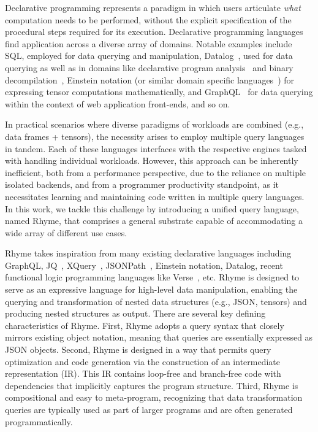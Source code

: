 \documentclass[runningheads]{llncs}
\newcommand{\lang}{Rhyme}
\begin{document}
Declarative programming represents a paradigm in which users articulate \emph{what}
computation needs to be performed, without the explicit specification of the
procedural steps required for its execution.
Declarative programming languages find application across a diverse array of
domains.
Notable examples include SQL, employed for data querying and manipulation,
Datalog~\cite{datalog}, used for data querying as well as in domains like
declarative program analysis~\cite{proganalysis_first, logic_proganalysis, souffle_cav}
and binary decompilation~\cite{ddissam}, Einstein notation (or similar domain
specific languages~\cite{tensor_comprehensions}) for expressing tensor computations
mathematically, and GraphQL~\cite{graphql} for data querying within the context of web application
front-ends, and so on.

In practical scenarios where diverse paradigms of workloads are combined
(e.g., data frames + tensors), the necessity arises to employ multiple
query languages in tandem.
Each of these languages interfaces with the respective engines tasked
with handling individual workloads.
However, this approach can be inherently inefficient, both from a performance
perspective, due to the reliance on multiple isolated backends, and from
a programmer productivity standpoint, as it necessitates learning and
maintaining code written in multiple query languages.
In this work, we tackle this challenge by introducing a unified query language, 
named \lang{},
that comprises a general substrate capable of accommodating a wide array of
different use cases.

\lang{} takes inspiration from many existing declarative languages
including GraphQL, JQ~\cite{jq}, XQuery~\cite{xquery}, JSONPath~\cite{jsonpath}, Einstein notation,
Datalog, recent functional logic programming languages like Verse~\cite{verse}, etc.
\lang{} is designed to serve as an expressive language for high-level data
manipulation, enabling the querying and transformation of nested data structures
(e.g., JSON, tensors)
and producing nested structures as output.
There are several key defining characteristics of \lang{}.
First, \lang{} adopts a query syntax that closely mirrors existing object notation,
meaning that queries are essentially expressed as JSON objects.
Second, \lang{} is designed in a way that permits query optimization and
code generation via the construction of an intermediate representation (IR).
This IR contains loop-free and branch-free code with dependencies that implicitly
captures the program structure.
Third, \lang{} is compositional and easy to meta-program, recognizing that data
transformation queries are typically used as part of larger programs and are often
generated programmatically.
\end{document}
